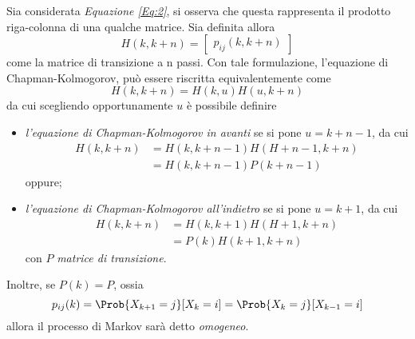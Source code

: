 \documentclass{subfiles}
\begin{document}
Sia considerata \emph{Equazione \ref{Eq:2}}, si osserva che questa rappresenta il prodotto riga-colonna di una qualche matrice.
Sia definita allora
\[
    H(k, k + n) = \begin{bmatrix}
        p_{ij}(k, k + n)
    \end{bmatrix}
\]
come la matrice di transizione a n passi.
Con tale formulazione, l'equazione di Chapman-Kolmogorov, può essere riscritta equivalentemente come
\[
    H(k, k + n) = H(k, u)H(u, k + n)
\]
da cui scegliendo opportunamente \(u\) è possibile definire
\begin{itemize}
    \item \emph{l'equazione di Chapman-Kolmogorov in avanti} se si pone \(u = k + n - 1\), da cui
          \[\begin{aligned}
                  H(k, k + n) & = H(k, k + n - 1)H(H + n - 1, k + n) \\
                              & = H(k, k + n - 1)P(k + n - 1)
              \end{aligned}\]
          oppure;
    \item \emph{l'equazione di Chapman-Kolmogorov all'indietro} se si pone \(u = k + 1\), da cui
          \[\begin{aligned}
                  H(k, k + n) & = H(k, k + 1)H(H + 1, k + n) \\
                              & = P(k)H(k + 1, k + n)
              \end{aligned}\]
          con \(P\) \emph{matrice di transizione}.
\end{itemize}
Inoltre, se \(P(k) = P\), ossia
\[
    p_{ij}(k) = \Prob{X_{k + 1} = j}[X_{k} = i] = \Prob{X_{k} = j}[X_{k - 1} = i]
\]
allora il processo di Markov sarà detto \emph{omogeneo}.
\end{document}

